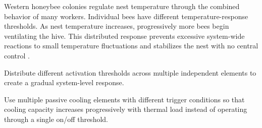 Western honeybee colonies regulate nest temperature through the combined behavior of
many workers. Individual bees have different temperature-response thresholds. As nest
temperature increases, progressively more bees begin ventilating the hive. This
distributed response prevents excessive system-wide reactions to small temperature
fluctuations and stabilizes the nest with no central control \cite{peters2019}.

 Distribute different activation thresholds across
multiple independent elements to create a gradual system-level response.

 Use multiple passive cooling elements with
different trigger conditions so that cooling capacity increases progressively with
thermal load instead of operating through a single on/off threshold.

